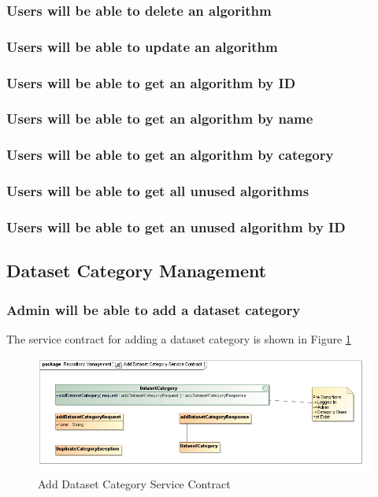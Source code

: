 \subsubsection {Users will be able to delete an algorithm}
\subsubsection {Users will be able to update an algorithm}
\subsubsection {Users will be able to get an algorithm by ID}
\subsubsection {Users will be able to get an algorithm by name}
\subsubsection {Users will be able to get an algorithm by category}
\subsubsection {Users will be able to get all unused algorithms}
\subsubsection {Users will be able to get an unused algorithm by ID}

\subsection{Dataset Category Management}

\subsubsection {Admin will be able to add a dataset category}
The service contract for adding a dataset category is shown in Figure \ref{fig:addDatasetCatService}
\begin{figure}[H]
  \begin{center}
  \includegraphics[scale=0.6]{../Diagrams and Charts/Test Data/Add Dataset Category Service Contract.jpg}
  \caption{Add Dataset Category Service Contract}
  \end{center}
  \label{fig:addDatasetCatService}
\end{figure}


